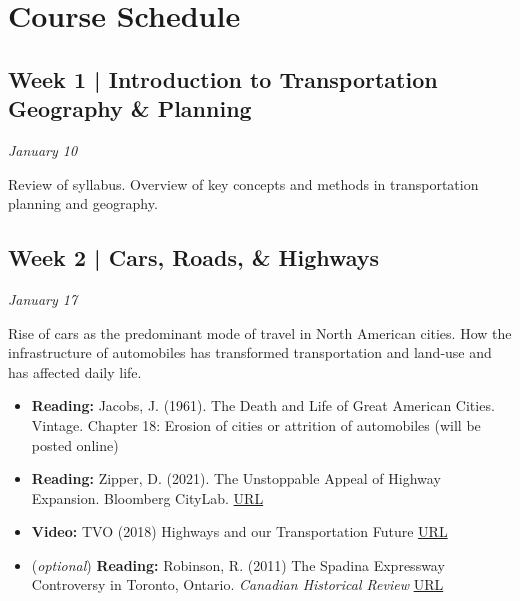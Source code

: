 \documentclass[11pt]{article}
\begin{document}
	\newpage
	
	\section*{Course Schedule}
	
	
	\subsection*{Week 1 | Introduction to Transportation Geography \& Planning}
	
	\textit{January 10}

	Review of syllabus. Overview of key concepts and methods in transportation planning and geography. 
	
	
	
	
	\subsection*{Week 2 | Cars, Roads, \& Highways}
	
	\textit{January 17}
	
	Rise of cars as the predominant mode of travel in North American cities. How the infrastructure of automobiles has transformed transportation and land-use and has affected daily life. 
	
	\begin{itemize}
		
		\item \textbf{Reading:} Jacobs, J. (1961). The Death and Life of Great American Cities. Vintage.
		Chapter 18: Erosion of cities or attrition of automobiles (will be posted online)
					
		\item \textbf{Reading:} Zipper, D. (2021). The Unstoppable Appeal of Highway Expansion. Bloomberg CityLab. \href{https://www.bloomberg.com/news/features/2021-09-28/why-widening-highways-doesn-t-bring-traffic-relief}{URL}
		
		\item \textbf{Video:} TVO (2018) 
		Highways and our Transportation Future \href{https://www.tvo.org/video/highways-and-our-transportation-future}{URL}
		
		\item (\textit{optional}) \textbf{Reading:} Robinson, R. (2011) The Spadina Expressway Controversy in Toronto, Ontario. \textit{ Canadian Historical Review} \href{https://www.utpjournals.press/doi/pdf/10.3138/chr.92.2.295}{URL}
	\end{itemize}
\end{document}
